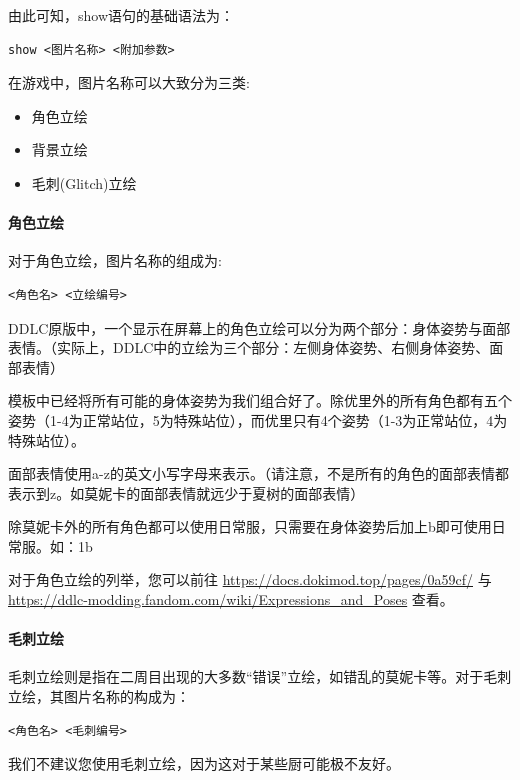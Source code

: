 \documentclass[../../Main.tex]{subfiles}
\begin{document}
由此可知，show语句的基础语法为：
\begin{lstlisting}[numbers=none]
show <图片名称> <附加参数>
\end{lstlisting}

在游戏中，图片名称可以大致分为三类:
\begin{itemize}
    \item 角色立绘
    \item 背景立绘
    \item 毛刺(Glitch)立绘
\end{itemize}

\paragraph{角色立绘}\label{para:2.2.2.1}

对于角色立绘，图片名称的组成为:
\begin{lstlisting}[numbers=none]
<角色名> <立绘编号>
\end{lstlisting}

DDLC原版中，一个显示在屏幕上的角色立绘可以分为两个部分：身体姿势与面部表情。（实际上，DDLC中的立绘为三个部分：左侧身体姿势、右侧身体姿势、面部表情）

模板中已经将所有可能的身体姿势为我们组合好了。除优里外的所有角色都有五个姿势（1-4为正常站位，5为特殊站位），而优里只有4个姿势（1-3为正常站位，4为特殊站位）。

面部表情使用a-z的英文小写字母来表示。（请注意，不是所有的角色的面部表情都表示到z。如莫妮卡的面部表情就远少于夏树的面部表情）

除莫妮卡外的所有角色都可以使用日常服，只需要在身体姿势后加上b即可使用日常服。如：1b

对于角色立绘的列举，您可以前往 \url{https://docs.dokimod.top/pages/0a59cf/} 与 \url{https://ddlc-modding.fandom.com/wiki/Expressions_and_Poses} 查看。


\paragraph{毛刺立绘}

毛刺立绘则是指在二周目出现的大多数“错误”立绘，如错乱的莫妮卡等。对于毛刺立绘，其图片名称的构成为：
\begin{lstlisting}[numbers=none]
<角色名> <毛刺编号>
\end{lstlisting}

\begin{Warning}
    我们不建议您使用毛刺立绘，因为这对于某些厨可能极不友好。
\end{Warning}
\end{document}
